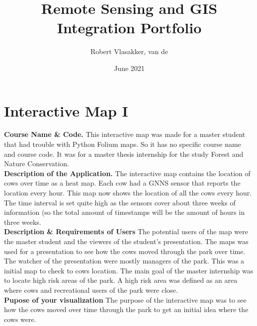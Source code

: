 \documentclass{article}
\title{Remote Sensing and GIS Integration Portfolio}
\author{Robert Vlasakker, van de}
\date{June 2021}
\begin{document}
\maketitle

\section{Interactive Map I}
\textbf{Course Name \& Code.}
This interactive map was made for a master student that had trouble with Python Folium maps. 
So it has no specific course name and course code. 
It was for a master thesis internship for the study Forest and Nature Conservation.
\\

\noindent
\textbf{Description of the Application.}
The interactive map contains the location of cows over time as a heat map. 
Each cow had a GNNS sensor that reports the location every hour.
This map now shows the location of all the cows every hour. 
The time interval is set quite high as the sensors cover about three weeks of information (so the total amount of timestamps will be the amount of hours in three weeks.
\\

\noindent
\textbf{Description \& Requirements of Users}
The potential users of the map were the master student and the viewers of the student's presentation.
The maps was used for a presentation to see how the cows moved through the park over time.
The watcher of the presentation were mostly managers of the park. 
This was a initial map to check to cows location. 
The main goal of the master internship was to locate high risk areas of the park.
A high risk area was defined as an area where cows and recreational users of the park were close.
\\

\textbf{Pupose of your visualization}
The purpose of the interactive map was to see how the cows moved over time through the park to get an initial idea where the cows were.
\end{document}
